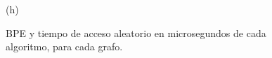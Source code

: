 \begin{figure}
\begin{minipage}{1\textwidth}
\begin{minipage}{0.45\textwidth}
    			(h)
    		\end{minipage}  
    	\end{minipage}
    	
%    		
    	 
    \caption{BPE y tiempo de acceso aleatorio en microsegundos de cada algoritmo, para cada grafo.}
    \label{fig:bpetAle}
\end{figure}
